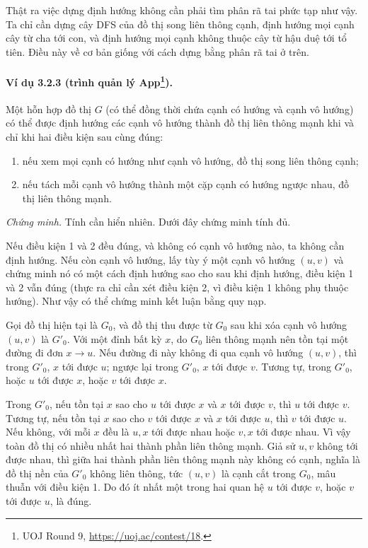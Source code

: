 \documentclass[11pt]{article}
\renewcommand{\leadsto}{\mathrel{\longrightarrow}}
\begin{document}
Thật ra việc dựng định hướng không cần phải tìm phân rã tai phức tạp như vậy. Ta
chỉ cần dựng cây DFS của đồ thị song liên thông cạnh, định hướng mọi cạnh cây từ
cha tới con, và định hướng mọi cạnh không thuộc cây từ hậu duệ tới tổ tiên. Điều
này về cơ bản giống với cách dựng bằng phân rã tai ở trên.

\paragraph{Ví dụ 3.2.3 (trình quản lý App\protect\footnote{UOJ Round 9, \url{https://uoj.ac/contest/18}.}).}
Một hỗn hợp đồ thị $G$ (có thể đồng thời chứa cạnh có hướng và cạnh vô hướng) có
thể được định hướng các cạnh vô hướng thành đồ thị liên thông mạnh khi và chỉ
khi hai điều kiện sau cùng đúng:
\begin{enumerate}
  \item nếu xem mọi cạnh có hướng như cạnh vô hướng, đồ thị song liên thông cạnh;
  \item nếu tách mỗi cạnh vô hướng thành một cặp cạnh có hướng ngược nhau, đồ thị
  liên thông mạnh.
\end{enumerate}

\emph{Chứng minh.}
Tính cần hiển nhiên. Dưới đây chứng minh tính đủ.

Nếu điều kiện 1 và 2 đều đúng, và không có cạnh vô hướng nào, ta không cần định
hướng. Nếu còn cạnh vô hướng, lấy tùy ý một cạnh vô hướng $(u,v)$ và chứng minh
nó có một cách định hướng sao cho sau khi định hướng, điều kiện 1 và 2 vẫn đúng
(thực ra chỉ cần xét điều kiện 2, vì điều kiện 1 không phụ thuộc hướng). Như vậy
có thể chứng minh kết luận bằng quy nạp.

Gọi đồ thị hiện tại là $G_0$, và đồ thị thu được từ $G_0$ sau khi xóa cạnh vô
hướng $(u,v)$ là $G'_0$. Với một đỉnh bất kỳ $x$, do $G_0$ liên thông mạnh nên
tồn tại một đường đi đơn $x\leadsto u$. Nếu đường đi này không đi qua cạnh vô
hướng $(u,v)$, thì trong $G'_0$, $x$ tới được $u$; ngược lại trong $G'_0$, $x$
tới được $v$. Tương tự, trong $G'_0$, hoặc $u$ tới được $x$, hoặc $v$ tới được
$x$.

Trong $G'_0$, nếu tồn tại $x$ sao cho $u$ tới được $x$ và $x$ tới được $v$, thì
$u$ tới được $v$. Tương tự, nếu tồn tại $x$ sao cho $v$ tới được $x$ và $x$ tới
được $u$, thì $v$ tới được $u$. Nếu không, với mỗi $x$ đều là $u,x$ tới được
nhau hoặc $v,x$ tới được nhau. Vì vậy toàn đồ thị có nhiều nhất hai thành phần
liên thông mạnh. Giả sử $u,v$ không tới được nhau, thì giữa hai thành phần liên
thông mạnh này không có cạnh, nghĩa là đồ thị nền của $G'_0$ không liên thông,
tức $(u,v)$ là cạnh cắt trong $G_0$, mâu thuẫn với điều kiện 1. Do đó ít nhất
một trong hai quan hệ $u$ tới được $v$, hoặc $v$ tới được $u$, là đúng.
\end{document}
